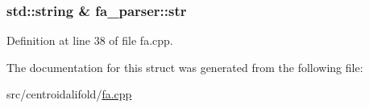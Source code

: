 \hypertarget{structfa__parser_a8a5f4b32bd12a9c4aa27b5a8dc830c5c}{
\subsubsection[{str}]{\setlength{\rightskip}{0pt plus 5cm}std\+::string \& fa\+\_\+parser\+::str}}\label{structfa__parser_a8a5f4b32bd12a9c4aa27b5a8dc830c5c}


Definition at line 38 of file fa.\+cpp.



The documentation for this struct was generated from the following file\+:\begin{DoxyCompactItemize}
\item 
src/centroidalifold/\hyperlink{centroidalifold_2fa_8cpp}{fa.\+cpp}\end{DoxyCompactItemize}
